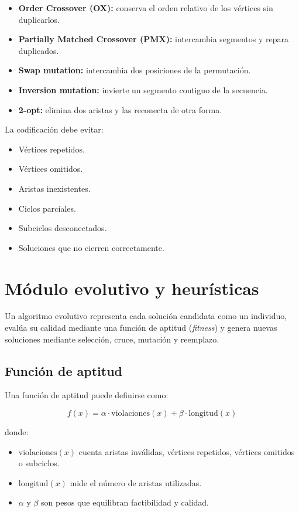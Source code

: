 \documentclass[12pt]{article}
\begin{document}
\begin{itemize}
    \item \textbf{Order Crossover (OX):} conserva el orden relativo de los vértices sin duplicarlos.
    \item \textbf{Partially Matched Crossover (PMX):} intercambia segmentos y repara duplicados.
    \item \textbf{Swap mutation:} intercambia dos posiciones de la permutación.
    \item \textbf{Inversion mutation:} invierte un segmento contiguo de la secuencia.
    \item \textbf{2-opt:} elimina dos aristas y las reconecta de otra forma.
\end{itemize}

La codificación debe evitar:

\begin{itemize}
    \item Vértices repetidos.
    \item Vértices omitidos.
    \item Aristas inexistentes.
    \item Ciclos parciales.
    \item Subciclos desconectados.
    \item Soluciones que no cierren correctamente.
\end{itemize}

\section{Módulo evolutivo y heurísticas}

Un algoritmo evolutivo representa cada solución candidata como un individuo, evalúa su calidad mediante una función de aptitud (\textit{fitness}) y genera nuevas soluciones mediante selección, cruce, mutación y reemplazo.

\subsection{Función de aptitud}

Una función de aptitud puede definirse como:

\[
f(x)=\alpha \cdot \text{violaciones}(x)+\beta \cdot \text{longitud}(x)
\]

donde:

\begin{itemize}
    \item \(\text{violaciones}(x)\) cuenta aristas inválidas, vértices repetidos, vértices omitidos o subciclos.
    \item \(\text{longitud}(x)\) mide el número de aristas utilizadas.
    \item \(\alpha\) y \(\beta\) son pesos que equilibran factibilidad y calidad.
\end{itemize}
\end{document}
